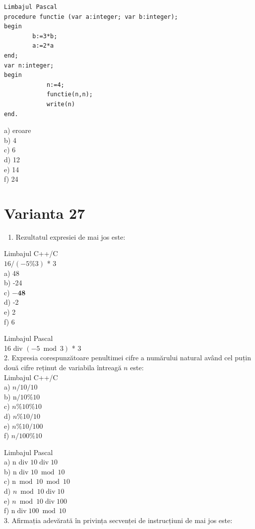 \documentclass[10pt]{article}
\begin{document}
\begin{verbatim}
Limbajul Pascal
procedure functie (var a:integer; var b:integer);
begin
        b:=3*b;
        a:=2*a
end;
var n:integer;
begin
            n:=4;
            functie(n,n);
            write(n)
end.
\end{verbatim}

a) eroare\\
b) 4\\
c) 6\\
d) 12\\
e) 14\\
f) 24

\section*{Varianta 27}
\begin{enumerate}
  \item Rezultatul expresiei de mai jos este:
\end{enumerate}

Limbajul C++/C\\
$16 /(-5 \% 3)$ * 3\\
a) 48\\
b) -24\\
c) $\mathbf{- 4 8}$\\
d) -2\\
e) 2\\
f) 6

Limbajul Pascal\\
16 div $(-5 \bmod 3)$ * 3\\
2. Expresia corespunzătoare penultimei cifre a numărului natural având cel puțin două cifre reținut de variabila întreagă $n$ este:\\
Limbajul C++/C\\
a) $n / 10 / 10$\\
b) $\mathrm{n} / 10 \% 10$\\
c) $n \% 10 \% 10$\\
d) $n \% 10 / 10$\\
e) $n \% 10 / 100$\\
f) $n / 100 \% 10$

Limbajul Pascal\\
a) n div $10 \operatorname{div} 10$\\
b) n div $10 \bmod 10$\\
c) $\mathrm{n} \bmod 10 \bmod 10$\\
d) $n \bmod 10 \operatorname{div} 10$\\
e) $n \bmod 10 \operatorname{div} 100$\\
f) $\mathrm{n} \operatorname{div} 100 \bmod 10$\\
3. Afirmația adevărată în privința secvenței de instrucțiuni de mai jos este:
\end{document}
